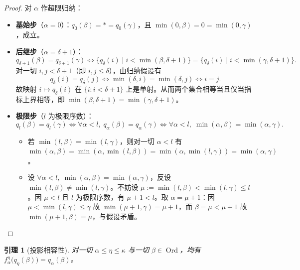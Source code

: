 \documentclass[11pt,a4paper]{ctexart}
\theoremstyle{definition}
\theoremstyle{plain}
\newtheorem{lemma}[definition]{引理}
\newcommand{\Ord}{\operatorname{Ord}}
\begin{document}
\begin{proof}
对 $\alpha$ 作超限归纳：
\begin{itemize}[leftmargin=2em]
  \item \textbf{基始步}（$\alpha = 0$）：$q_0(\beta) = * = q_0(\gamma)$，且 $\min(0, \beta) = 0 = \min(0, \gamma)$，成立。
  \item \textbf{后继步}（$\alpha = \delta + 1$）：
    \[
      q_{\delta+1}(\beta) = q_{\delta+1}(\gamma) \iff \bigl\{q_\delta(i) \mid i < \min(\beta, \delta+1)\bigr\} = \bigl\{q_\delta(i) \mid i < \min(\gamma, \delta+1)\bigr\}.
    \]
    对一切 $i, j < \delta+1$（即 $i, j \le \delta$），由归纳假设有
    \[
      q_\delta(i) = q_\delta(j) \iff \min(\delta, i) = \min(\delta, j) \iff i = j.
    \]
    故映射 $i \mapsto q_\delta(i)$ 在 $\{i : i < \delta+1\}$ 上是单射。从而两个集合相等当且仅当指标上界相等，即 $\min(\beta, \delta+1) = \min(\gamma, \delta+1)$。
  \item \textbf{极限步}（$l$ 为极限序数）：
    \[
      q_l(\beta) = q_l(\gamma) \iff \forall \alpha < l,\; q_\alpha(\beta) = q_\alpha(\gamma) \iff \forall \alpha < l,\; \min(\alpha, \beta) = \min(\alpha, \gamma).
    \]
    \begin{itemize}
      \item[($\Leftarrow$)] 若 $\min(l, \beta) = \min(l, \gamma)$，则对一切 $\alpha < l$ 有 $\min(\alpha, \beta) = \min(\alpha, \min(l, \beta)) = \min(\alpha, \min(l, \gamma)) = \min(\alpha, \gamma)$。
      \item[($\Rightarrow$)] 设 $\forall \alpha < l,\; \min(\alpha, \beta) = \min(\alpha, \gamma)$，反设 $\min(l, \beta) \neq \min(l, \gamma)$。不妨设 $\mu := \min(l, \beta) < \min(l, \gamma) \le l$。因 $\mu < l$ 且 $l$ 为极限序数，有 $\mu + 1 < l$。取 $\alpha = \mu + 1$：因 $\mu < \min(l, \gamma) \le \gamma$ 故 $\min(\mu+1, \gamma) = \mu + 1$，而 $\beta = \mu < \mu + 1$ 故 $\min(\mu+1, \beta) = \mu$，与假设矛盾。 \qedhere
    \end{itemize}
\end{itemize}
\end{proof}

\begin{lemma}[投影相容性]
对一切 $\alpha \le \eta \le \kappa$ 与一切 $\beta \in \Ord$，均有 $f_\alpha^\eta\bigl(q_\eta(\beta)\bigr) = q_\alpha(\beta)$。
\end{lemma}
\end{document}
